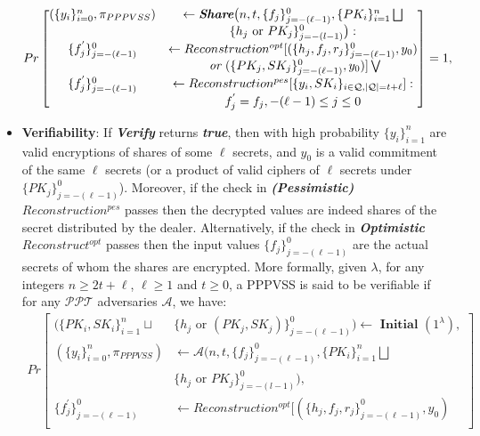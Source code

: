 \begin{itemize}
    \begin{align*}
      Pr\begin{bmatrix}
        (\{y_i\}_{i=0}^n,\pi_{PPPVSS})&\leftarrow \textit{\textbf{Share}} \big(n,t,\{f_j\}_{j=-(\ell-1)}^0,\{PK_i\}_{i=1}^n\bigsqcup\\
        &\{h_j\text{ or }PK_j\}_{j=-(l-1)}^0\big):\\
        \{f_j^{'}\}_{j=-(\ell-1)}^0&\leftarrow Reconstruction^{opt}[(\{h_j,f_j,r_j\}_{j=-(\ell-1)}^0,y_0)\\
        &\textit{ or }(\{PK_j,SK_j\}_{j=-(\ell-1)}^0,y_0)]\bigvee\\
        \{f_j^{'}\}_{j=-(\ell-1)}^0&\leftarrow Reconstruction^{pes}[\{y_i,SK_i\}_{i\in\mathcal{Q},|\mathcal{Q}|=t+\ell}]:\\
        &f_j^{'}=f_j,-(\ell-1)\leq j\leq 0
      \end{bmatrix} = 1,
    \end{align*}
  \item \textbf{Verifiability}: If \textit{\textbf{Verify}} returns \textit{\textbf{true}}, then with high 
    probability $\{y_i\}_{i=1}^n$ are valid encryptions of shares of some $\ell$ secrets, and $y_0$ is a 
    valid commitment of the same $\ell$ secrets (or a product of valid ciphers of $\ell$ secrets under 
    $\{PK_j\}_{j=-(\ell-1)}^0$). Moreover, if the check in \textit{\textbf{(Pessimistic)}} $Reconstruction^{pes}$ 
    passes then the decrypted values are indeed shares of the secret distributed by the dealer. Alternatively, 
    if the check in \textit{\textbf{Optimistic}} $Reconstruct^{opt}$ passes then the input values $\{f_j\}_{j=-(\ell-1)}^0$ 
    are the actual secrets of whom the shares are encrypted. More formally, given $\lambda$, for any integers 
    $n\geq 2t+\ell$, $\ell\geq 1$ and $t\geq 0$, a PPPVSS is said to be verifiable if for any $\mathcal{PPT}$ adversaries $\mathcal{A}$, 
    we have:
    \begin{align*}
      Pr\begin{bmatrix}
        \big(\{PK_i,SK_i\}_{i=1}^n\sqcup&\{h_j\text{ or }(PK_j,SK_j)\}_{j=-(\ell-1)}^0\big)\leftarrow\textbf{ Initial } (1^\lambda),\\
        (\{y_i\}_{i=0}^n,\pi_{PPPVSS})&\leftarrow \mathcal{A} \big(n,t,\{f_j\}_{j=-(\ell-1)}^0,\{PK_i\}_{i=1}^n\bigsqcup\\
        &\{h_j\text{ or }PK_j\}_{j=-(l-1)}^0\big),\\
        \{f_j^{'}\}_{j=-(\ell-1)}^0&\leftarrow Reconstruction^{opt}[(\{h_j,f_j,r_j\}_{j=-(\ell-1)}^0,y_0)\\

\end{bmatrix}
\end{align*}
\end{itemize}
